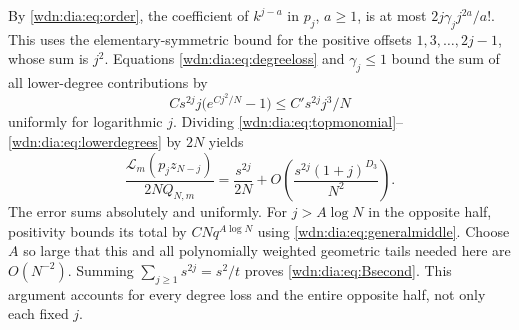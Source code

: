 \documentclass[11pt,letterpaper]{article}
\theoremstyle{remark}\newtheorem{remark}[theorem]{Remark}
\newcommand{\LL}{\mathcal L}
\begin{document}
By \eqref{wdn:dia:eq:order}, the coefficient of $k^{j-a}$ in $p_j$, $a\ge1$, is
at most $2j\gamma_j j^{2a}/a!$. This uses the elementary-symmetric bound
for the positive offsets $1,3,\ldots,2j-1$, whose sum is $j^2$.
Equations \eqref{wdn:dia:eq:degreeloss} and $\gamma_j\le1$ bound the sum of all
lower-degree contributions by
\begin{equation}\label{wdn:dia:eq:lowerdegrees}
 C s^{2j}j\bigl(e^{Cj^2/N}-1\bigr)
 \le C' s^{2j}j^3/N
\end{equation}
uniformly for logarithmic $j$. Dividing
\eqref{wdn:dia:eq:topmonomial}--\eqref{wdn:dia:eq:lowerdegrees} by $2N$ yields
\[
 \frac{\LL_m(p_jz_{N-j})}{2NQ_{N,m}}
 =\frac{s^{2j}}{2N}
 +O\left(\frac{s^{2j}(1+j)^{D_3}}{N^2}\right).
\]
The error sums absolutely and uniformly. For $j>A\log N$ in the opposite
half, positivity bounds its total by $C Nq^{A\log N}$ using
\eqref{wdn:dia:eq:generalmiddle}. Choose $A$ so large that this and all polynomially
weighted geometric tails needed here are $O(N^{-2})$. Summing
$\sum_{j\ge1}s^{2j}=s^2/t$ proves \eqref{wdn:dia:eq:Bsecond}. This argument accounts
for every degree loss and the entire opposite half, not only each fixed $j$.
\end{document}
